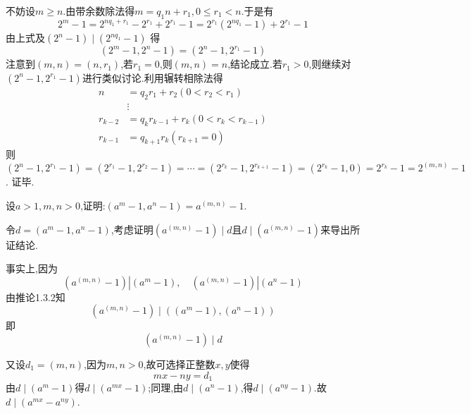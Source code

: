 \proof 不妨设$m \geqslant n$.由带余数除法得$m=q_{1} n+r_{1}, 0 \leqslant r_{1}<n$.于是有
\begin{equation*}
	2^{m}-1=2^{n q_{1}+r_{1}}-2^{r_{1}}+2^{r_{1}}-1=2^{r_{1}}\left(2^{n q_{1}}-1\right)+2^{r_{1}}-1
\end{equation*}
由上式及$\left(2^{n}-1\right) \mid\left(2^{n q_{1}}-1\right)$ 得
\begin{equation*}
	\left(2^{m}-1,2^{n}-1\right)=\left(2^{n}-1,2^{r_{1}}-1\right)
\end{equation*}
注意到$(m, n)=\left(n, r_{1}\right)$,若$r_{1}=0$,则$(m, n)=n$,结论成立.若$r_{1}>0$,则继续对$\left(2^{n}-1,2^{r_{1}}-1\right)$进行类似讨论.利用辗转相除法得
\begin{equation*}
	\begin{split}
		n & =q_{2} r_{1}+r_{2} \left(0<r_{2}<r_{1}\right) \\
		&\vdots\\
		r_{k-2} & =q_{k} r_{k-1}+r_{k}  \left(0<r_{k}<r_{k-1}\right) \\
		r_{k-1} & =q_{k+1} r_{k}  \left(r_{k+1}=0\right)
	\end{split}
\end{equation*}
则 $\left(2^{n}-1,2^{r_{1}}-1\right)=\left(2^{r_{1}}-1,2^{r_{2}}-1\right)=\cdots=\left(2^{r_{k}}-1,2^{r_{k+1}}-1\right)=\left(2^{r_{k}}-1,0\right)=2^{r_{k}}-1=2^{(m, n)}-1$.
证毕.

\example 设$a>1, m, n>0$,证明:$\left(a^{m}-1, a^{n}-1\right)=a^{(m, n)}-1$.

\proof 令$d=\left(a^{m}-1, a^{n}-1\right)$,考虑证明$\left(a^{(m, n)}-1\right) \mid d$且$d \mid\left(a^{(m, n)}-1\right)$来导出所证结论.

事实上,因为
\begin{equation*}
	\left(a^{(m, n)}-1\right)\left|\left(a^{m}-1\right), \quad\left(a^{(m, n)}-1\right)\right|\left(a^{n}-1\right)
\end{equation*}
由推论1.3.2知
\begin{equation*}
	\left(a^{(m, n)}-1\right) \mid\left(\left(a^{m}-1\right),\left(a^{n}-1\right)\right)
\end{equation*}
即
\begin{equation}\label{equ1.15}
	\left(a^{(m, n)}-1\right) \mid d
\end{equation}

又设$d_{1}=(m, n)$,因为$m, n>0$,故可选择正整数$x, y$使得
\begin{equation}\label{equ1.16}
	m x-n y=d_{1}
\end{equation}
由$d \mid\left(a^{m}-1\right)$得$d \mid\left(a^{m x}-1\right)$;同理,由$d \mid\left(a^{n}-1\right)$,得$d \mid\left(a^{n y}-1\right)$.故$d \mid\left(a^{m x}-a^{n y}\right)$.

